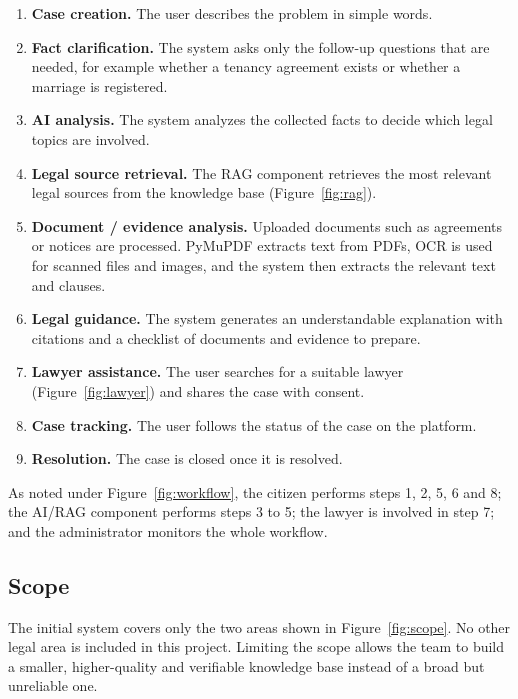 \documentclass[12pt,a4paper]{report}
\begin{document}
\begin{enumerate}
  \item \textbf{Case creation.} The user describes the problem in simple words.
  \item \textbf{Fact clarification.} The system asks only the follow-up questions that are needed, for example whether a tenancy agreement exists or whether a marriage is registered.
  \item \textbf{AI analysis.} The system analyzes the collected facts to decide which legal topics are involved.
  \item \textbf{Legal source retrieval.} The RAG component retrieves the most relevant legal sources from the knowledge base (Figure~\ref{fig:rag}).
  \item \textbf{Document / evidence analysis.} Uploaded documents such as agreements or notices are processed. PyMuPDF extracts text from PDFs, OCR is used for scanned files and images, and the system then extracts the relevant text and clauses.
  \item \textbf{Legal guidance.} The system generates an understandable explanation with citations and a checklist of documents and evidence to prepare.
  \item \textbf{Lawyer assistance.} The user searches for a suitable lawyer (Figure~\ref{fig:lawyer}) and shares the case with consent.
  \item \textbf{Case tracking.} The user follows the status of the case on the platform.
  \item \textbf{Resolution.} The case is closed once it is resolved.
\end{enumerate}
As noted under Figure~\ref{fig:workflow}, the citizen performs steps 1, 2, 5, 6 and 8; the AI/RAG component performs steps 3 to 5; the lawyer is involved in step 7; and the administrator monitors the whole workflow.

\subsection{Scope}
The initial system covers only the two areas shown in Figure~\ref{fig:scope}. No other legal area is included in this project. Limiting the scope allows the team to build a smaller, higher-quality and verifiable knowledge base instead of a broad but unreliable one.
\end{document}
